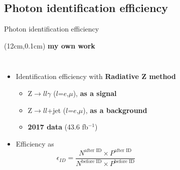 \subsection{Photon identification efficiency}
\begin{frame}{Photon identification efficiency}
\begin{textblock*}{5cm}(12cm,0.1cm) %
   \textcolor{HHred}{\Large\textbf{my own work}}
\end{textblock*}
\begin{columns}

\begin{itemize}
    \item Identification efficiency with \textcolor{HHred}{\textbf{Radiative Z method}} 
    \begin{itemize}
        \item Z$\to ll\gamma$ ($l$=$e$,$\mu$), \textbf{as a signal}
        \item Z$\to ll$+jet ($l$=$e$,$\mu$), \textbf{as a background}
        \item \textbf{2017 data} (43.6 fb$^{-1}$)
    \end{itemize}
    \item Efficiency as
    \begin{equation*}
        \epsilon_{ID} = \frac{N^{\text{after ID}} \times P^{\text{after ID}}}{N^{\text{before ID}} \times P^{\text{before ID}}}
    \end{equation*}
\end{itemize}


\end{columns}
\end{frame}
